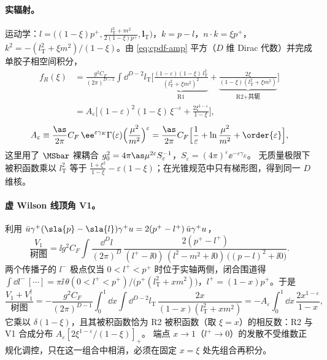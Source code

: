 \paragraph{实辐射。}
运动学：$l=\big((1-\xi)p^+,\frac{l_{\mathrm T}^2+m^2}{2(1-\xi)p^+},\bm l_{\mathrm T}\big)$，$k=p-l$，$n\cdot k=\xi p^+$，
$k^2=-(l_{\mathrm T}^2+\xi m^2)/(1-\xi)$。由 \cref{eq:cpdf-amp} 平方（$D$ 维 Dirac 代数）并完成单胶子相空间积分，
\begin{equation}\label{eq:cpdf-real}
\begin{aligned}
f_R(\xi)&=\frac{g^2C_F}{(2\pi)^{D-1}}\int\dd^{D-2}l_{\mathrm T}
\Big[\underbrace{\frac{(1-\varepsilon)(1-\xi)\,l_{\mathrm T}^2}{(l_{\mathrm T}^2+\xi m^2)^2}}_{\text{R1}}
+\underbrace{\frac{2\xi}{(1-\xi)(l_{\mathrm T}^2+\xi m^2)}}_{\text{R2+共轭}}\Big]\\
&=A_\varepsilon\Big[(1-\varepsilon)^2(1-\xi)\,\xi^{-\varepsilon}+\frac{2\xi^{1-\varepsilon}}{1-\xi}\Big],
\end{aligned}
\end{equation}
\begin{equation}\label{eq:cpdf-Aeps}
A_\varepsilon\equiv\frac{\as}{2\pi}C_F\,\ee^{\varepsilon\gamma_E}\Gamma(\varepsilon)\Big(\frac{\mu^2}{m^2}\Big)^{\varepsilon}
=\frac{\as}{2\pi}C_F\Big[\frac1\varepsilon+\ln\frac{\mu^2}{m^2}+\order{\varepsilon}\Big],
\end{equation}
这里用了 $\MSbar$ 裸耦合 $g_0^2=4\pi\as\mu^{2\varepsilon}S_\varepsilon^{-1}$，$S_\varepsilon=(4\pi)^\varepsilon\ee^{-\varepsilon\gamma_E}$。
无质量极限下被积函数乘以 $l_{\mathrm T}^2$ 等于 $\frac{1+\xi^2}{1-\xi}-\varepsilon(1-\xi)$；在光锥规范中只有梯形图，得到同一 $D$ 维核。

\paragraph{虚 Wilson 线顶角 V1。}
利用 $\bar u\gamma^+(\sla{p}-\sla{l})\gamma^+u=2(p^+-l^+)\,\bar u\gamma^+u$，
\begin{equation}
\frac{V_1}{\text{树图}}=\ii g^2C_F\int\frac{\dd^Dl}{(2\pi)^D}\,
\frac{2(p^+-l^+)}{(l^+-\ii0)\,(l^2-m^2+\ii0)\,\big((p-l)^2+\ii0\big)} .
\end{equation}
两个传播子的 $l^-$ 极点仅当 $0<l^+<p^+$ 时位于实轴两侧，闭合围道得
$\int\dd l^-\,[\cdots]=\pi\ii\,\theta(0<l^+<p^+)/\big(p^+(l_{\mathrm T}^2+xm^2)\big)$，$l^+=(1-x)p^+$。于是
\begin{equation}\label{eq:cpdf-V1}
\frac{V_1+V_1^\dagger}{\text{树图}}=-\frac{g^2C_F}{(2\pi)^{D-1}}\int_0^1\!\dd x\int\dd^{D-2}l_{\mathrm T}\,\frac{2x}{(1-x)(l_{\mathrm T}^2+xm^2)}
=-A_\varepsilon\int_0^1\dd x\,\frac{2x^{1-\varepsilon}}{1-x},
\end{equation}
它乘以 $\delta(1-\xi)$，且其被积函数恰为 R2 被积函数（取 $\xi=x$）的相反数：R2 与 V1 合成分布 $A_\varepsilon[2\xi^{1-\varepsilon}/(1-\xi)]_+$。
端点 $x\to1$（$l^+\to0$）的发散不受维数正规化调控，只在这一组合中相消，必须在固定 $x=\xi$ 处先组合再积分。

